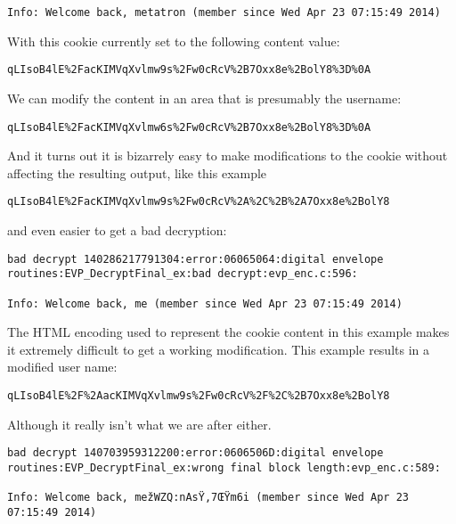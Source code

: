 \documentclass[12pt,letterpaper]{article}
\begin{document}
\begin{verbatim}
Info: Welcome back, metatron (member since Wed Apr 23 07:15:49 2014)
\end{verbatim}

With this cookie currently set to the following content value:

\begin{verbatim}
qLIsoB4lE%2FacKIMVqXvlmw9s%2Fw0cRcV%2B7Oxx8e%2BolY8%3D%0A
\end{verbatim}

We can modify the content in an area that is presumably the username:

\begin{verbatim}
qLIsoB4lE%2FacKIMVqXvlmw6s%2Fw0cRcV%2B7Oxx8e%2BolY8%3D%0A
\end{verbatim}

And it turns out it is bizarrely easy to make modifications to the
cookie without affecting the resulting output, like this example

\begin{verbatim}
qLIsoB4lE%2FacKIMVqXvlmw9s%2Fw0cRcV%2A%2C%2B%2A7Oxx8e%2BolY8
\end{verbatim}

and even easier to get a bad decryption:

\begin{verbatim}
bad decrypt 140286217791304:error:06065064:digital envelope
routines:EVP_DecryptFinal_ex:bad decrypt:evp_enc.c:596:

Info: Welcome back, me (member since Wed Apr 23 07:15:49 2014)
\end{verbatim}

The HTML encoding used to represent the cookie content in this example
makes it extremely difficult to get a working modification.
This example results in a modified user name:

\begin{verbatim}
qLIsoB4lE%2F%2AacKIMVqXvlmw9s%2Fw0cRcV%2F%2C%2B7Oxx8e%2BolY8
\end{verbatim}

Although it really isn't what we are after either.

\begin{verbatim}
bad decrypt 140703959312200:error:0606506D:digital envelope
routines:EVP_DecryptFinal_ex:wrong final block length:evp_enc.c:589:

Info: Welcome back, mežWZQ:nAsŸ‚7ŒŸm6i (member since Wed Apr 23 07:15:49 2014)

\end{verbatim}
\end{document}
